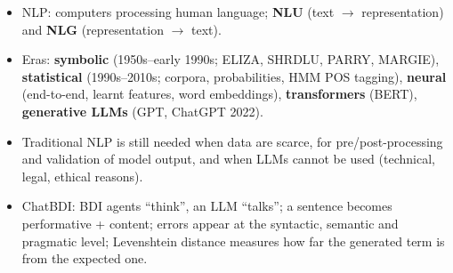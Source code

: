 \begin{nbsummary}
\begin{itemize}[nosep]
  \item NLP: computers processing human language; \textbf{NLU} (text $\to$
        representation) and \textbf{NLG} (representation $\to$ text).
  \item Eras: \textbf{symbolic} (1950s--early 1990s; ELIZA, SHRDLU, PARRY, MARGIE),
        \textbf{statistical} (1990s--2010s; corpora, probabilities, HMM POS tagging),
        \textbf{neural} (end-to-end, learnt features, word embeddings),
        \textbf{transformers} (BERT), \textbf{generative LLMs} (GPT, ChatGPT 2022).
  \item Traditional NLP is still needed when data are scarce, for pre/post-processing and
        validation of model output, and when LLMs cannot be used (technical, legal,
        ethical reasons).
  \item ChatBDI: BDI agents ``think'', an LLM ``talks''; a sentence becomes performative
        + content; errors appear at the syntactic, semantic and pragmatic level;
        Levenshtein distance measures how far the generated term is from the expected one.
\end{itemize}
\end{nbsummary}
